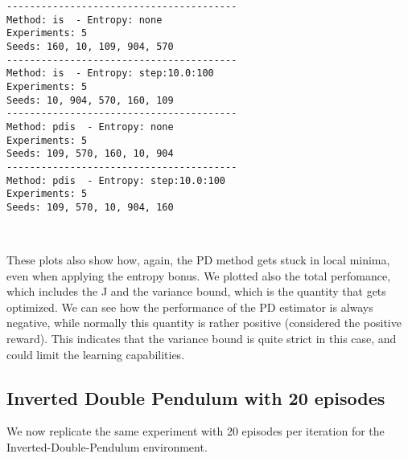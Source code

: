 \documentclass[11pt]{article}
\begin{document}
    \begin{Verbatim}[commandchars=\\\{\}]
----------------------------------------
Method: is  - Entropy: none
Experiments: 5
Seeds: 160, 10, 109, 904, 570
----------------------------------------
Method: is  - Entropy: step:10.0:100
Experiments: 5
Seeds: 10, 904, 570, 160, 109
----------------------------------------
Method: pdis  - Entropy: none
Experiments: 5
Seeds: 109, 570, 160, 10, 904
----------------------------------------
Method: pdis  - Entropy: step:10.0:100
Experiments: 5
Seeds: 109, 570, 10, 904, 160

    \end{Verbatim}

    \begin{center}
    \end{center}
    { \hspace*{\fill} \\}
    
    These plots also show how, again, the PD method gets stuck in local
minima, even when applying the entropy bonus. We plotted also the total
perfomance, which includes the J and the variance bound, which is the
quantity that gets optimized. We can see how the performance of the PD
estimator is always negative, while normally this quantity is rather
positive (considered the positive reward). This indicates that the
variance bound is quite strict in this case, and could limit the
learning capabilities.

    \hypertarget{inverted-double-pendulum-with-20-episodes}{%
\subsection{Inverted Double Pendulum with 20
episodes}\label{inverted-double-pendulum-with-20-episodes}}

We now replicate the same experiment with 20 episodes per iteration for
the Inverted-Double-Pendulum environment.
\end{document}

